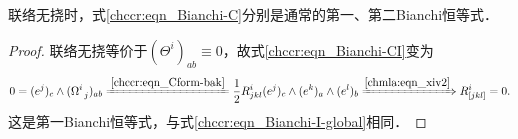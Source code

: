 \begin{theorem}\label{chccr:thm_bianchi-12}
    联络无挠时，式\eqref{chccr:eqn_Bianchi-C}分别是通常的第一、第二Bianchi恒等式．
\end{theorem}
\begin{proof}
    联络无挠等价于$(\Theta ^{i})_{ab} \equiv 0$，故式\eqref{chccr:eqn_Bianchi-CI}变为
    \begin{equation}\label{chccr:eqn_Bianchi-I}
        0 = (e^j)_c \wedge (\Omega_{\hphantom{a} j} ^{i})_{ab}
        \xlongequal{\ref{chccr:eqn_Cform-bak}} \frac{1}{2}R_{jkl}^i
        (e^j)_c \wedge (e^k)_a \wedge (e^l)_b
        \xRightarrow{\ref{chmla:eqn_xiv2}}
        R_{[jkl]}^i =0 .
    \end{equation}
    这是第一Bianchi恒等式，与式\eqref{chccr:eqn_Bianchi-I-global}相同．



\end{proof}
